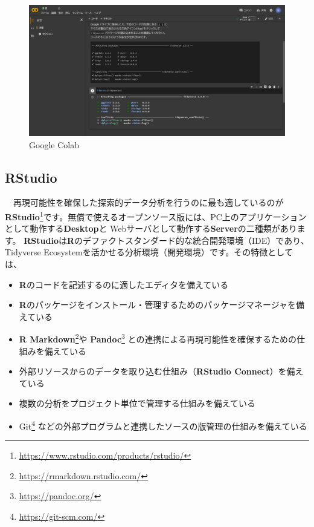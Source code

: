 \documentclass[
  12pt,
]{book}
\DeclareRobustCommand{\href}[2]{#2\footnote{\url{#1}}}
\providecommand{\tightlist}{%
  \setlength{\itemsep}{0pt}\setlength{\parskip}{0pt}}
\begin{document}
\begin{figure}[H]

{\centering \includegraphics[width=0.9\linewidth,]{./fig/Colab/Firsttime} 

}

\caption{Google Colab}\label{fig:unnamed-chunk-15}
\end{figure}

\hypertarget{rstudio}{%
\subsection{RStudio}\label{rstudio}}

　再現可能性を確保した探索的データ分析を行うのに最も適しているのが\href{https://www.rstudio.com/products/rstudio/}{\textbf{RStudio}}です。無償で使えるオープンソース版には、PC上のアプリケーションとして動作する\textbf{Desktop}と Webサーバとして動作する\textbf{Server}の二種類があります。 \textbf{RStudio}は\textbf{R}のデファクトスタンダード的な統合開発環境（IDE）であり、Tidyverse Ecosystemを活かせる分析環境（開発環境）です。その特徴としては、

\begin{itemize}
\tightlist
\item
  \textbf{R}のコードを記述するのに適したエディタを備えている
\item
  \textbf{R}のパッケージをインストール・管理するためのパッケージマネージャを備えている
\item
  \href{https://rmarkdown.rstudio.com/}{\textbf{R Markdown}}や \href{https://pandoc.org/}{\textbf{Pandoc}} との連携による再現可能性を確保するための仕組みを備えている
\item
  外部リソースからのデータを取り込む仕組み（\textbf{RStudio Connect}）を備えている
\item
  複数の分析をプロジェクト単位で管理する仕組みを備えている
\item
  \href{https://git-scm.com/}{Git} などの外部プログラムと連携したソースの版管理の仕組みを備えている
\end{itemize}
\end{document}
